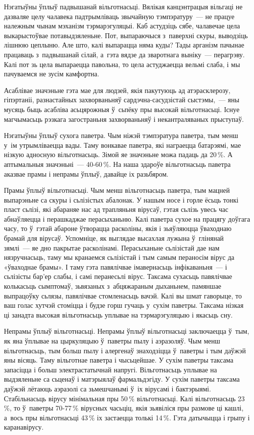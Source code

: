 Нэгатыўны ўплыў падвышанай вільготнасьці. Вялікая канцэнтрацыя вільгаці не дазваляе целу чалавека падтрымліваць звычайную тэмпэратуру~--- не працуе належным чынам мэханізм тэрмарэгуляцыі. Каб астудзіць сябе, чалавечае цела выкарыстоўвае потавыдзяленьне. Пот, выпараючыся з~паверхні скуры, выводзіць лішнюю цеплыню. Але што, калі выпарацца няма куды? Тады арганізм пачынае працаваць з~падвышанай сілай, а~гэта вядзе да зваротнага выніку~--- перагрэву. Калі пот зь цела выпараецца павольна, то цела астуджаецца вельмі слаба, і мы пачуваемся не зусім камфортна.

Асаблівае значэньне гэта мае для людзей, якія пакутуюць ад атэрасклерозу, гіпэртаніі, разнастайных захворваньняў сардэчна-сасудзістай сыстэмы,~--- яны мусяць быць асабліва асьцярожныя ў~сьпёку пры высокай вільготнасьці. Існуе магчымасьць рэзкага загостраньня захворваньняў і некантраляваных прыступаў.

Нэгатыўны ўплыў сухога паветра. Чым ніжэй тэмпэратура паветра, тым менш у~ім утрымліваецца вады. Таму вонкавае паветра, які награецца батарэямі, мае нізкую адносную вільготнасьць. Зімой яе значэньне можа падаць да 20\,\%. А аптымальныя значэньні~--- 40-60\,\%. На наша здароўе вільготнасьць паветра аказвае прамы і непрамы ўплыў, давайце іх разьбяром.

Прамы ўплыў вільготнасьці. Чым менш вільготнасьць паветра, тым мацней выпарэньне са скуры і сьлізістых абалонак. У нашым носе і горле ёсьць тонкі пласт сьлізі, які абараняе нас ад трапляньня вірусаў, гэтая сьлізь увесь час абнаўляецца і перашкаджае перасыханьню. Калі паветра сухое на працягу доўгага часу, то ў~гэтай абароне ўтворацца расколіны, якія і зьяўляюцца ўваходнаю брамай для вірусаў. Успомніце, як выглядае высахлая лужына ў~глінянай зямлі~--- яе дно пакрытае расколінамі. Перасыханьне сьлізістай дае нам нязручнасьць, таму мы кранаемся сьлізістай і тым самым пераносім вірус да «ўваходнае брамы». І таму гэта павялічвае імавернасьць інфікаваньня~--- і сьлізісты бар'ер слабы, і самі перанесьлі вірус. Таксама сухасьць павялічвае колькасьць сымптомаў, зьвязаных з~абцяжараным дыханьнем, памяншае выпрацоўку сьлязы, павялічвае стомленасьць вачэй. Калі вы шмат гаворыце, то ваш голас хутчэй стоміцца і будзе горш гучаць у~сухім паветры. Таксама нізкая ці занадта высокая вільготнасьць уплывае на тэрмарэгуляцыю і якасьць сну.

Непрамы ўплыў вільготнасьці. Непрамы ўплыў вільготнасьці заключаецца ў~тым, як яна ўплывае на цыркуляцыю ў~паветры пылу і аэразоляў. Чым менш вільготнасьць, тым больш пылу і алергенаў знаходзіцца ў~паветры і тым даўжэй яны вісяць. Таму вільготнае паветра і чысьцейшае. У сухім паветры таксама запасіцца і больш электрастатычнай напругі. Вільготнасьць уплывае на выдзяленьне са сьценаў і матэрыялаў фармальдэгіду. У сухім паветры таксама даўжэй лётаюць аэразолі са зьмешчанымі ў~іх вірусамі і бактэрыямі. Стабільнасьць вірусу мінімальная пры 50\,\% вільготнасьці. Калі вільготнасьць 23\,\%, то ў~паветры 70-77\,\% вірусных часьціц, якія зьявіліся пры размове ці кашлі, а~вось пры вільготнасьці 43\,\% іх застаецца толькі 14\,\%. Гэта датычыцца і грыпу і каранавірусу.

